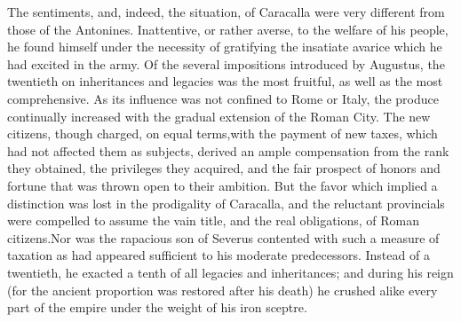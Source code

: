 The sentiments, and, indeed, the situation, of Caracalla were
very different from those of the Antonines. Inattentive, or
rather averse, to the welfare of his people, he found himself
under the necessity of gratifying the insatiate avarice which he
had excited in the army. Of the several impositions introduced by
Augustus, the twentieth on inheritances and legacies was the most
fruitful, as well as the most comprehensive. As its influence was
not confined to Rome or Italy, the produce continually increased
with the gradual extension of the Roman City. The new citizens,
though charged, on equal terms,\footnotemark[113] with the payment of new
taxes, which had not affected them as subjects, derived an ample
compensation from the rank they obtained, the privileges they
acquired, and the fair prospect of honors and fortune that was
thrown open to their ambition. But the favor which implied a
distinction was lost in the prodigality of Caracalla, and the
reluctant provincials were compelled to assume the vain title,
and the real obligations, of Roman citizens.\footnotemark[1131] Nor was the
rapacious son of Severus contented with such a measure of
taxation as had appeared sufficient to his moderate predecessors.
Instead of a twentieth, he exacted a tenth of all legacies and
inheritances; and during his reign (for the ancient proportion
was restored after his death) he crushed alike every part of the
empire under the weight of his iron sceptre.\footnotemark[114]





